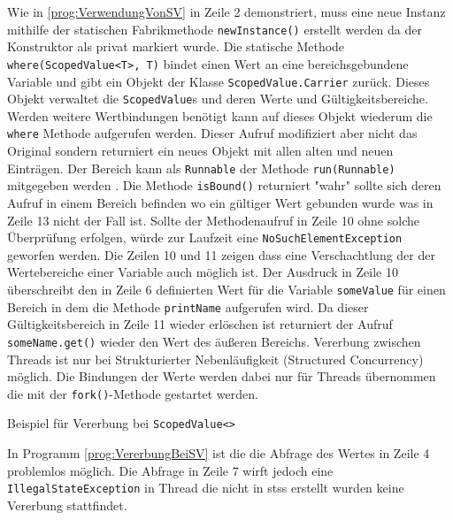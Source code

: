     Wie in \ref{prog:VerwendungVonSV} in Zeile 2 demonstriert, muss eine neue Instanz mithilfe der statischen Fabrikmethode \texttt{newInstance()} erstellt werden da der Konstruktor als privat 
    markiert wurde. 
    Die statische Methode \texttt{where(ScopedValue<T>, T)} bindet einen Wert an eine bereichsgebundene Variable und gibt ein Objekt der Klasse \texttt{ScopedValue.Carrier} zurück.
    Dieses Objekt verwaltet die \texttt{ScopedValue}s und deren Werte und Gültigkeitsbereiche. Werden weitere Wertbindungen benötigt kann auf dieses Objekt wiederum die \texttt{where} Methode 
    aufgerufen werden. Dieser Aufruf modifiziert aber nicht das Original sondern returniert ein neues Objekt mit allen alten und neuen Einträgen. Der Bereich kann als \texttt{Runnable}
    der Methode \texttt{run(Runnable)} mitgegeben werden \cite{oracle22Carrier}. 
    Die Methode \texttt{isBound()} returniert "wahr" sollte sich deren Aufruf in einem Bereich befinden wo ein gültiger Wert gebunden wurde was in Zeile 13 nicht der Fall ist.
    Sollte der Methodenaufruf in Zeile 10 ohne solche Überprüfung erfolgen, würde zur Laufzeit eine \texttt{NoSuchElementException} geworfen werden.
    Die Zeilen 10 und 11 zeigen dass eine Verschachtlung der der Wertebereiche einer Variable auch möglich ist. Der Ausdruck in Zeile 10 überschreibt den in Zeile 6 definierten Wert für die Variable
    \texttt{someValue} für einen Bereich in dem die Methode \texttt{printName} aufgerufen wird. Da dieser Gültigkeitsbereich in Zeile 11 wieder erlöschen ist returniert der Aufruf
    \texttt{someName.get()} wieder den Wert des äußeren Bereichs. Vererbung zwischen Threads ist nur bei Strukturierter Nebenläufigkeit (Structured Concurrency) möglich. Die Bindungen der Werte
    werden dabei nur für Threads übernommen die mit der \texttt{fork()}-Methode gestartet werden.
    \begin{program} [H]
        \caption{Beispiel für Vererbung bei \texttt{ScopedValue<>}}
        \label{prog:VererbungBeiSV}
    \begin{JavaCode}[language=Java, numbers=left]
private static final ScopedValue<String> NAME = ScopedValue.newInstance();
ScopedValue.runWhere(NAME, "duke", () -> {
    try (var scope = new StructuredTaskScope<String>()) {
        scope.fork(() -> {System.out.println(STR."Name: \{NAME.get()}");return null;});
    }
    Thread.ofVirtual().start(() -> {
        System.out.println(STR."Name: \{NAME.get()}");
    });    
});\end{JavaCode}
\end{program}
In Programm \ref{prog:VererbungBeiSV} ist die die Abfrage des Wertes in Zeile 4 problemlos möglich. Die Abfrage in Zeile 7 wirft
jedoch eine \texttt{IllegalStateException} in Thread die nicht in \Glspl{sts}
erstellt wurden keine Vererbung stattfindet.


